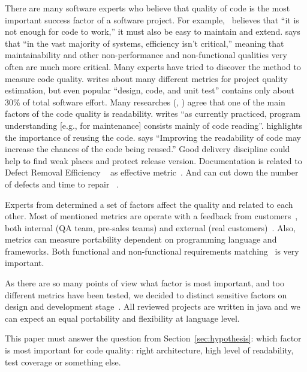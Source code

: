\documentclass[12pt,oneside]{article}
\begin{document}
There are many software experts who believe that quality of code is the
most important success factor of a software project.
For example,~\citet{martin2009clean} believes that ``it is not enough for code to work,'' it must also be easy to maintain and extend.
\citet{mcconnell2004code} says that ``in the vast majority of systems, efficiency isn't critical,''
meaning that maintainability and other non-performance and non-functional
qualities very often are much more critical. Many experts have tried to discover the method to measure code quality.
\citet{cj-mess} writes about many different metrics for project quality estimation, but even popular ``design, code, and unit test'' contains only about 30\% of total software effort. Many researches (\citet{chall1995formula}, \citet{hunt2002arch}) agree that one of the main factors of the code quality is readability. \citet{rugaber2000use} writes ``as currently practiced, program understanding [e.g., for maintenance] consists mainly of code reading''. \citet{gamma1994reuse} highlights the importance of reusing the code. \citet{collar2006reuse} says ``Improving the readability of code may increase the chances of the code being reused.''
Good delivery discipline could help to find weak places and protect release version. Documentation is related to Defect Removal Efficiency ~\citep{cj-sqin2012,cj-mess} as effective metric~\citep{marandi2014dre}. And can cut down the number of defects and time to repair ~\citep[pp.265--266]{jones2012economics}.\par

Experts from \citet{pf-wp-whichmetricsmatter} determined a set of factors affect the quality and related to each other.
Most of mentioned metrics are operate with a feedback from customers~\citep{marandi2014dre}, both internal (QA team, pre-sales teams) and external (real customers)~\cite{jones2012economics}. Also, metrics can measure portability dependent on programming language and frameworks. Both functional and non-functional requirements matching~\cite{cj-mess} is very important.\par
As there are so many points of view what factor is most important, and too different metrics have been tested, we decided to distinct sensitive factors on design and development stage~\cite{rani2017sdlc}. All reviewed projects are written in java and we can expect an equal portability and flexibility at language level.\par
This paper must answer the question from Section~\ref{sec:hypothesis}: which factor is most important for code quality: right architecture, high level of readability, test coverage or something else.\par
\end{document}
